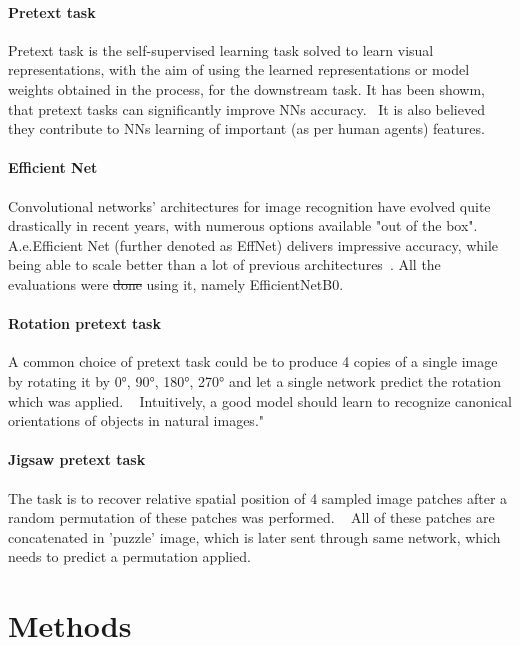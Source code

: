 \paragraph{Pretext task}
Pretext task is the self-supervised learning task solved to learn visual representations,
with the aim of using the learned representations or model weights obtained in the process, for the downstream task.
It has been showm, that pretext tasks can significantly improve NNs accuracy.~\cite{kolesnikov2019revisiting}
It is also believed they contribute to NNs learning of important (as per human agents) features.

\paragraph{Efficient Net}
Convolutional networks' architectures for image recognition have evolved quite drastically in recent years, with numerous options available "out of the box".
A.e.Efficient Net (further denoted as EffNet) delivers impressive accuracy, while being able to scale better than a lot of previous architectures~\cite{DBLP:journals/corr/abs-1905-11946}.
All the evaluations were \st{done} using it, namely EfficientNetB0.

\paragraph{Rotation pretext task}
A common choice of pretext task could be to produce 4 copies of
a single image by rotating it by {0°, 90°, 180°, 270°} and let a single network predict the rotation which was applied.
~\cite{kolesnikov2019revisiting}
Intuitively, a good model should learn to recognize canonical orientations of objects in natural images."

\paragraph{Jigsaw pretext task}
The task is to recover relative spatial position of 4 sampled image patches after a random permutation of these patches was performed.
~\cite{kolesnikov2019revisiting}
All of these patches are concatenated in 'puzzle' image, which is later sent through same network, which needs to predict a permutation applied.


\section{Methods}



